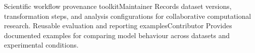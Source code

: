  {Scientific workflow provenance toolkit}{Maintainer}{
  Records dataset versions, transformation steps, and analysis configurations
  for collaborative computational research.
}
  {Reusable evaluation and reporting examples}{Contributor}{
  Provides documented examples for comparing model behaviour across datasets
  and experimental conditions.
}
